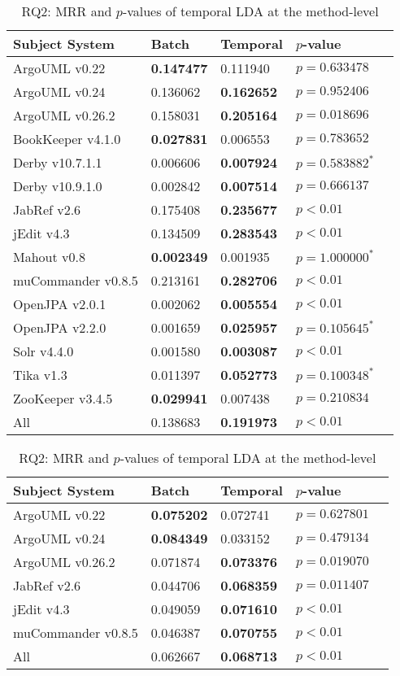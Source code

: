 \begin{table}[t]
\renewcommand{\arraystretch}{1.3}
\footnotesize
\centering
\caption{RQ2: MRR and $p$-values of temporal LDA at the class-level}
\begin{tabular}{l|ll|ll}
\toprule
Subject System & Batch & Temporal & $p$-value  \\
\midrule
ArgoUML v0.22 & {\bf 0.147477 } & 0.111940 & $p = 0.633478$ \\
ArgoUML v0.24 & 0.136062 & {\bf 0.162652 } & $p = 0.952406$ \\
ArgoUML v0.26.2 & 0.158031 & {\bf 0.205164 } & $p = 0.018696$ \\
BookKeeper v4.1.0 & {\bf 0.027831 } & 0.006553 & $p = 0.783652$ \\
Derby v10.7.1.1 & 0.006606 & {\bf 0.007924 } & $p = 0.583882^{*}$ \\
Derby v10.9.1.0 & 0.002842 & {\bf 0.007514 } & $p = 0.666137$ \\
JabRef v2.6 & 0.175408 & {\bf 0.235677 } & $p < 0.01$ \\
jEdit v4.3 & 0.134509 & {\bf 0.283543 } & $p < 0.01$ \\
Mahout v0.8 & {\bf 0.002349 } & 0.001935 & $p = 1.000000^{*}$ \\
muCommander v0.8.5 & 0.213161 & {\bf 0.282706 } & $p < 0.01$ \\
OpenJPA v2.0.1 & 0.002062 & {\bf 0.005554 } & $p < 0.01$ \\
OpenJPA v2.2.0 & 0.001659 & {\bf 0.025957 } & $p = 0.105645^{*}$ \\
Solr v4.4.0 & 0.001580 & {\bf 0.003087 } & $p < 0.01$ \\
Tika v1.3 & 0.011397 & {\bf 0.052773 } & $p = 0.100348^{*}$ \\
ZooKeeper v3.4.5 & {\bf 0.029941 } & 0.007438 & $p = 0.210834$ \\
\midrule
All & 0.138683 & {\bf 0.191973 } & $p < 0.01$ \\
\bottomrule
\end{tabular}
\label{table:rq2:class:lda}
\caption{RQ2: MRR and $p$-values of temporal LDA at the method-level}
\begin{tabular}{l|ll|ll}
\toprule
Subject System & Batch & Temporal & $p$-value  \\
\midrule
ArgoUML v0.22 & {\bf 0.075202 } & 0.072741 & $p = 0.627801$ \\
ArgoUML v0.24 & {\bf 0.084349 } & 0.033152 & $p = 0.479134$ \\
ArgoUML v0.26.2 & 0.071874 & {\bf 0.073376 } & $p = 0.019070$ \\
JabRef v2.6 & 0.044706 & {\bf 0.068359 } & $p = 0.011407$ \\
jEdit v4.3 & 0.049059 & {\bf 0.071610 } & $p < 0.01$ \\
muCommander v0.8.5 & 0.046387 & {\bf 0.070755 } & $p < 0.01$ \\
\midrule
All & 0.062667 & {\bf 0.068713 } & $p < 0.01$ \\
\bottomrule
\end{tabular}
\label{table:rq2:method:lda}
\end{table}
